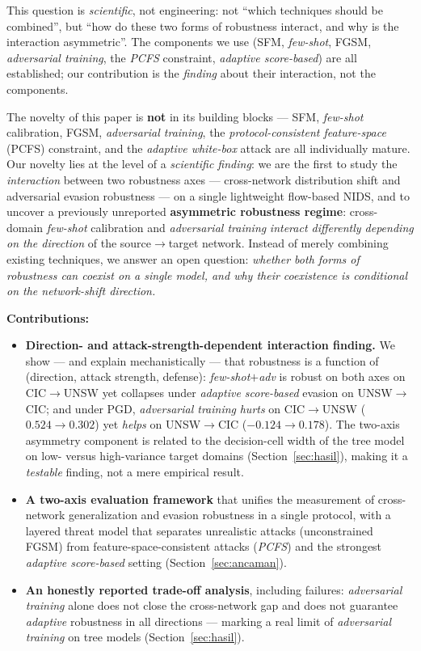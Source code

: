 \documentclass[preprint,12pt,authoryear]{elsarticle}
\begin{document}
\noindent This question is \emph{scientific}, not engineering: not ``which
techniques should be combined'', but ``how do these two forms of robustness
interact, and why is the interaction asymmetric''. The components we use (SFM,
\emph{few-shot}, FGSM, \emph{adversarial training}, the \emph{PCFS} constraint,
\emph{adaptive score-based}) are all established; our contribution is the
\emph{finding} about their interaction, not the components.

The novelty of this paper is \textbf{not} in its building blocks --- SFM,
\emph{few-shot} calibration, FGSM, \emph{adversarial training}, the
\emph{protocol-consistent feature-space} (PCFS) constraint, and the \emph{adaptive
white-box} attack are all individually mature. Our novelty lies at the level of a
\emph{scientific finding}: we are the first to study the \emph{interaction} between
two robustness axes --- cross-network distribution shift and adversarial evasion
robustness --- on a single lightweight flow-based NIDS, and to uncover a previously
unreported \textbf{asymmetric robustness regime}: cross-domain \emph{few-shot}
calibration and \emph{adversarial training} \emph{interact differently depending on
the direction} of the source$\rightarrow$target network. Instead of merely
combining existing techniques, we answer an open question: \emph{whether both forms
of robustness can coexist on a single model, and why their coexistence is
conditional on the network-shift direction.}

\noindent\textbf{Contributions:}
\begin{itemize}
  \item \textbf{Direction- and attack-strength-dependent interaction finding.}
  We show --- and explain mechanistically --- that robustness is a function of
  (direction, attack strength, defense): \emph{few-shot$+$adv} is robust on both axes
  on CIC$\rightarrow$UNSW yet collapses under \emph{adaptive score-based} evasion on
  UNSW$\rightarrow$CIC; and under PGD, \emph{adversarial training} \emph{hurts} on
  CIC$\rightarrow$UNSW ($0.524\rightarrow0.302$) yet \emph{helps} on
  UNSW$\rightarrow$CIC ($-0.124\rightarrow0.178$). The two-axis asymmetry component is
  related to the decision-cell width of the tree model on low- versus high-variance
  target domains (Section~\ref{sec:hasil}), making it a \emph{testable} finding, not
  a mere empirical result.
  \item \textbf{A two-axis evaluation framework} that unifies the measurement of
  cross-network generalization and evasion robustness in a single protocol, with a
  layered threat model that separates unrealistic attacks (unconstrained FGSM) from
  feature-space-consistent attacks (\emph{PCFS}) and the strongest \emph{adaptive score-based} setting (Section~\ref{sec:ancaman}).
  \item \textbf{An honestly reported trade-off analysis}, including failures:
  \emph{adversarial training} alone does not close the cross-network gap and does
  not guarantee \emph{adaptive} robustness in all directions --- marking a real
  limit of \emph{adversarial training} on tree models (Section~\ref{sec:hasil}).
\end{itemize}
\end{document}
